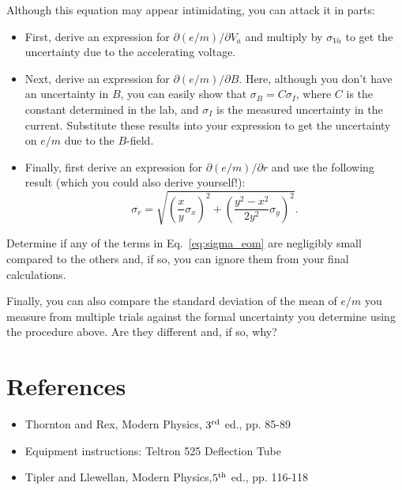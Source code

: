 Although this equation may appear intimidating, you can attack it in parts:
\begin{itemize}
  \item First, derive an expression for $\partial(e/m)/\partial V_a$ and
    multiply by $\sigma_{Va}$ to get the uncertainty due to the accelerating
    voltage.
  \item Next, derive an expression for $\partial(e/m)/\partial B$. Here,
    although you don't have an uncertainty in $B$, you can easily show that
    $\sigma_B = C\sigma_I$, where $C$ is the constant determined in the lab, and
    $\sigma_I$ is the measured uncertainty in the current. Substitute these
    results into your expression to get the uncertainty on $e/m$ due to the
    $B$-field.
  \item Finally, first derive an expression for $\partial(e/m)/\partial r$ and
    use the following result (which you could also derive yourself!):
    \begin{equation}
      \sigma_r = \sqrt{ \left(\frac{x}{y}\sigma_x\right)^2 +
        \left(\frac{y^2-x^2}{2y^2} \sigma_y\right)^2 }.
    \end{equation}
\end{itemize}

Determine if any of the terms in Eq.~\ref{eq:sigma_eom} are negligibly small
compared to the others and, if so, you can ignore them from your final
calculations. 

Finally, you can also compare the standard deviation of the mean of $e/m$ you
measure from multiple trials against the formal uncertainty you determine using
the procedure above. Are they different and, if so, why?


\section{References}
\begin{itemize}
\item Thornton and Rex, Modern Physics, $3^{\rm rd}$ ed., pp. 85-89
\item Equipment instructions: Teltron 525 Deflection Tube
\item Tipler and Llewellan, Modern Physics,$5^{\rm th}$ ed., pp. 116-118
\end{itemize}

